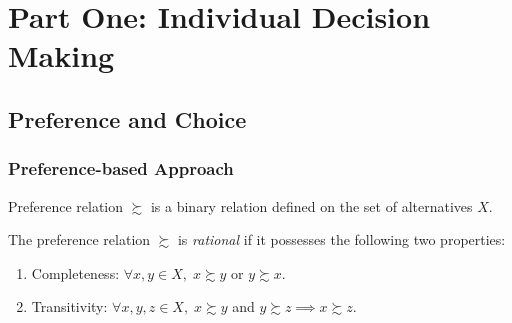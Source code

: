 \documentclass[12pt,fleqn]{book} %
\begin{document}




\pagestyle{empty} %

\tableofcontents %

\cleardoublepage %

\pagestyle{fancy} %

\part{Part One: Individual Decision Making}



\chapter{Preference and Choice}

\section{Preference-based Approach}

\begin{definition}
	Preference relation $\succsim$ is a binary relation defined on the set of alternatives $X$.
\end{definition}

\begin{definition}[Rational]
	The preference relation $\succsim$ is \emph{rational} if it possesses the following two properties:
	\begin{enumerate}
		\item Completeness: $\forall x,y\in X,\;x\succsim y$ or $y\succsim x$.
		\item Transitivity: $\forall x,y,z\in X,\;x\succsim y$ and $y\succsim z \implies x\succsim z$.
	\end{enumerate}
\end{definition}
\end{document}
